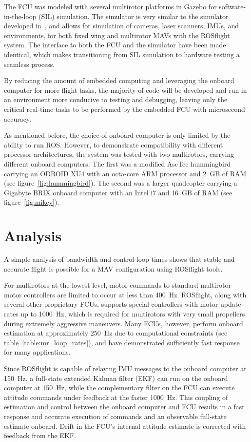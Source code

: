 \documentclass[letterpaper, 10 pt, conference]{ieeeconf}  %
\begin{document}
The FCU was modeled with several multirotor platforms in Gazebo for software-in-the-loop (SIL) simulation.  The simulator is very similar to the simulator developed in~\cite{Furrer2016}, and allows for simulation of cameras, laser scanners, IMUs, and environments, for both fixed wing and multirotor MAVs with the ROSflight system.  The interface to both the FCU and the simulator have been made identical, which makes transitioning from SIL simulation to hardware testing a seamless process.
 
By reducing the amount of embedded computing and leveraging the onboard computer for more flight tasks, the majority of code will be developed and run in an environment more conducive to testing and debugging, leaving only the critical real-time tasks to be performed by the embedded FCU with microsecond accuracy.	

As mentioned before, the choice of onboard computer is only limited by the ability to run ROS.  However, to demonstrate compatibility with different processor architectures, the system was tested with two multirotors, carrying different onboard computers. The first was a modified AscTec hummingbird carrying an ODROID XU4 with an octa-core ARM processor and 2~GB of RAM (see figure~\ref{fig:hummingbird}). The second was a larger quadcopter carrying a Gigabyte BRIX onboard computer with an Intel i7 and 16~GB of RAM (see figure~\ref{fig:mikey}).  

\section{Analysis}

A simple analysis of bandwidth and control loop times shows that stable and accurate flight is possible for a MAV configuration using ROSflight tools.  

For multirotors at the lowest level, motor commands to standard multirotor motor controllers are limited to occur at less than 400~Hz.  ROSflight, along with several other proprietary FCUs, supports special controllers with motor update rates up to 1000~Hz, which is required for multirotors with very small propellers during extremely aggressive maneuvers. Many FCUs, however, perform onboard estimation at approximately 250~Hz due to computational constraints (see table~\ref{table:mr_loop_rates}), and have demonstrated sufficiently fast response for many applications.

Since ROSflight is capable of relaying IMU messages to the onboard computer at 150~Hz, a full-state extended Kalman filter (EKF) can run on the onboard computer at 150~Hz, while the complementary filter on the FCU can execute attitude commands under feedback at the faster 1000~Hz.  This coupling of estimation and control between the onboard computer and FCU results in a fast response and accurate execution of commands and an observable full-state estimate onboard.  Drift in the FCU's internal attitude estimate is corrected with feedback from the EKF.
\end{document}
